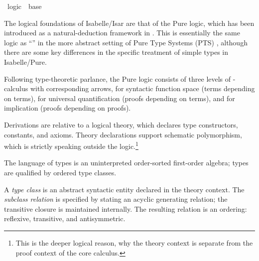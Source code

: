 %
\begin{isabellebody}%
\def\isabellecontext{logic}%
%
\isadelimtheory
\isanewline
\isanewline
\isanewline
%
\endisadelimtheory
%
\isatagtheory
{}\isamarkupfalse%
\ logic\ \ base\ %
\endisatagtheory
{\isafoldtheory}%
%
\isadelimtheory
%
\endisadelimtheory
%
\isamarkuptrue%
%
\begin{isamarkuptext}%
The logical foundations of Isabelle/Isar are that of the Pure logic,
  which has been introduced as a natural-deduction framework in
  \cite{paulson700}.  This is essentially the same logic as ``'' in the more abstract setting of Pure Type Systems (PTS)
  \cite{Barendregt-Geuvers:2001}, although there are some key
  differences in the specific treatment of simple types in
  Isabelle/Pure.

  Following type-theoretic parlance, the Pure logic consists of three
  levels of \isa{{\isasymlambda}}-calculus with corresponding arrows, \isa{{\isasymRightarrow}} for syntactic function space (terms depending on terms), \isa{{\isasymAnd}} for universal quantification (proofs depending on terms), and
  \isa{{\isasymLongrightarrow}} for implication (proofs depending on proofs).

  Derivations are relative to a logical theory, which declares type
  constructors, constants, and axioms.  Theory declarations support
  schematic polymorphism, which is strictly speaking outside the
  logic.\footnote{This is the deeper logical reason, why the theory
  context \isa{{\isasymTheta}} is separate from the proof context \isa{{\isasymGamma}}
  of the core calculus.}%
\end{isamarkuptext}%
\isamarkuptrue%
%
\isamarkuptrue%
%
\begin{isamarkuptext}%
The language of types is an uninterpreted order-sorted first-order
  algebra; types are qualified by ordered type classes.

  \medskip A \emph{type class} is an abstract syntactic entity
  declared in the theory context.  The \emph{subclass relation}  is specified by stating an acyclic
  generating relation; the transitive closure is maintained
  internally.  The resulting relation is an ordering: reflexive,
  transitive, and antisymmetric.


\end{isamarkuptext}
\end{isabellebody}
